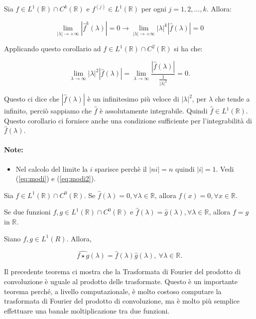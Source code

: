 \begin{corollary}
    Sia $f \in L^1(\mathbb{R}) \cap C^k(\mathbb{R})$ e $f^{\left(j\right)} \in
        L^1(\mathbb{R})$ per ogni $j = 1, 2, \ldots, k$. Allora:

    $$
        \lim_{ |\lambda| \rightarrow +\infty } \left| \hat{f}^k(\lambda) \right| = 0 \rightarrow
        \lim_{ |\lambda| \rightarrow +\infty } \left|\lambda\right|^k\left| \hat{f}(\lambda) \right| = 0
    $$
\end{corollary}

Applicando questo corollario ad $f \in L^1(\mathbb{R}) \cap C^2(\mathbb{R})$ si ha che:

$$
    \lim_{\lambda \rightarrow \infty} \left| \lambda \right|^2 \left|
    \hat{f}(\lambda) \right|  = \lim_{\lambda \rightarrow \infty}
    \frac{\left|\hat{f}(\lambda)\right|}{ \frac{1}{ \left| \lambda
            \right|^2}} = 0.
$$

Questo ci dice che $\left|\hat{f}(\lambda)\right|$ è un infinitesimo più veloce di
$\left|\lambda\right|^2$, per $\lambda$ che tende a infinito, perciò sappiamo che $\hat{f}$ è
assolutamente integrabile. Quindi $\hat{f} \in L^1(\mathbb{R})$. Questo
corollario ci fornisce anche una condizione sufficiente per l'integrabilità di
$\hat{f}(\lambda)$.

\paragraph*{Note:}
\begin{itemize}
    \item Nel calcolo del limite la $i$ sparisce perchè il $|ni| = n$
          quindi $|i| = 1$. Vedi (\ref{eq:modi}) e (\ref{eq:modi2}).
\end{itemize}

\begin{theorem}
    Sia $f \in L^1(\mathbb{R}) \cap C^0(\mathbb{R})$.
    Se $\hat{f}(\lambda) = 0, \forall \lambda \in \mathbb{R}$, allora $f(x) = 0, \forall x \in \mathbb{R}$.\\
\end{theorem}

\begin{corollary}
    Se due funzioni $f, g \in L^1(\mathbb{R}) \cap C^0(\mathbb{R})$ e $\hat{f}(\lambda) = \hat{g}(\lambda), \forall \lambda \in \mathbb{R}$,
    allora $f = g$ in $\mathbb{R}$.
\end{corollary}

\begin{theorem}
    Siano $f, g \in L^1(R)$. Allora,

    $$
        \widehat{f \star g}(\lambda) = \hat{f}(\lambda) \hat{g}(\lambda), \
        \forall \lambda \in \mathbb{R}.
    $$
\end{theorem}

Il precedente teorema ci mostra che la Trasformata di Fourier del prodotto di
convoluzione è uguale al prodotto delle trasformate. Questo è un importante teorema
perché, a livello computazionale, è molto costoso computare la trasformata di Fourier
del prodotto di convoluzione, ma è molto più semplice effettuare una banale moltiplicazione
tra due funzioni.
